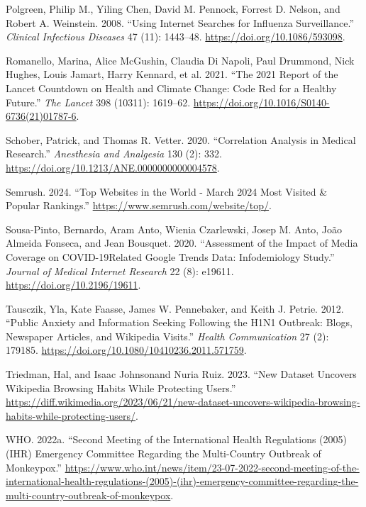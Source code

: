 \documentclass[
  12pt,
]{article}
\newlength{\cslhangindent}
\newenvironment{CSLReferences}[2] %
 {\begin{list}{}{%
  \setlength{\itemindent}{0pt}
  \setlength{\leftmargin}{0pt}
  \setlength{\parsep}{0pt}
  \ifodd #1
   \setlength{\leftmargin}{\cslhangindent}
   \setlength{\itemindent}{-1\cslhangindent}
  \fi
  \setlength{\itemsep}{#2\baselineskip}}}
 {\end{list}}
\begin{document}
\begin{CSLReferences}{1}{0}
Polgreen, Philip M., Yiling Chen, David M. Pennock, Forrest D. Nelson,
and Robert A. Weinstein. 2008. {``Using Internet Searches for Influenza
Surveillance.''} \emph{Clinical Infectious Diseases} 47 (11): 1443--48.
\url{https://doi.org/10.1086/593098}.

Romanello, Marina, Alice McGushin, Claudia Di Napoli, Paul Drummond,
Nick Hughes, Louis Jamart, Harry Kennard, et al. 2021. {``The 2021
Report of the Lancet Countdown on Health and Climate Change: Code Red
for a Healthy Future.''} \emph{The Lancet} 398 (10311): 1619--62.
\url{https://doi.org/10.1016/S0140-6736(21)01787-6}.

Schober, Patrick, and Thomas R. Vetter. 2020. {``Correlation Analysis in
Medical Research.''} \emph{Anesthesia and Analgesia} 130 (2): 332.
\url{https://doi.org/10.1213/ANE.0000000000004578}.

Semrush. 2024. {``Top Websites in the World - March 2024 Most Visited \&
Popular Rankings.''} \url{https://www.semrush.com/website/top/}.

Sousa-Pinto, Bernardo, Aram Anto, Wienia Czarlewski, Josep M. Anto, João
Almeida Fonseca, and Jean Bousquet. 2020. {``Assessment of the Impact of
Media Coverage on COVID-19{\textendash}Related Google Trends Data:
Infodemiology Study.''} \emph{Journal of Medical Internet Research} 22
(8): e19611. \url{https://doi.org/10.2196/19611}.

Tausczik, Yla, Kate Faasse, James W. Pennebaker, and Keith J. Petrie.
2012. {``Public Anxiety and Information Seeking Following the H1N1
Outbreak: Blogs, Newspaper Articles, and Wikipedia Visits.''}
\emph{Health Communication} 27 (2): 179185.
\url{https://doi.org/10.1080/10410236.2011.571759}.

Triedman, Hal, and Isaac Johnsonand Nuria Ruiz. 2023. {``New Dataset
Uncovers Wikipedia Browsing Habits While Protecting Users.''}
\url{https://diff.wikimedia.org/2023/06/21/new-dataset-uncovers-wikipedia-browsing-habits-while-protecting-users/}.

WHO. 2022a. {``Second Meeting of the International Health Regulations
(2005) (IHR) Emergency Committee Regarding the Multi-Country Outbreak of
Monkeypox.''}
\url{https://www.who.int/news/item/23-07-2022-second-meeting-of-the-international-health-regulations-(2005)-(ihr)-emergency-committee-regarding-the-multi-country-outbreak-of-monkeypox}.


\end{CSLReferences}
\end{document}

